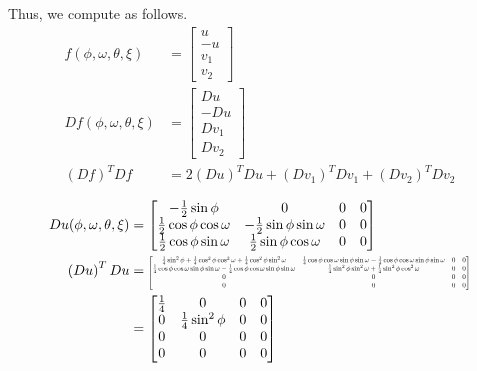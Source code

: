 \documentclass[12pt]{article}
\newcommand*{\Scale}[2][4]{\scalebox{#1}{$#2$}}%
\begin{document}
Thus, we compute as follows. 
\begin{align}
  f(\phi, \omega, \theta, \xi) &= \begin{bmatrix} u \\ -u \\ v_1 \\ v_2 \end{bmatrix} \\
  Df(\phi, \omega, \theta, \xi) &= \begin{bmatrix} Du \\ -Du \\ Dv_1 \\ Dv_2 \end{bmatrix} \\
  \left(Df\right)^TDf &=   2\left(Du\right)^TDu  + \left(Dv_1\right)^TDv_1 + \left(Dv_2\right)^TDv_2 
\end{align}

\begin{align}
  Du(\phi, \omega, \theta, \xi) &= \begin{bmatrix} -\frac{1}{2}\sin\phi & 0 & 0 & 0 \\ \frac{1}{2}\cos\phi\cos\omega & -\frac{1}{2}\sin\phi\sin\omega & 0 & 0\\  \frac{1}{2}\cos\phi\sin\omega & \frac{1}{2}\sin\phi\cos\omega & 0 & 0\end{bmatrix} \\
  \left(Du\right)^TDu &= \Scale[0.50]{\begin{bmatrix} 
\frac{1}{4}\sin^2\phi + \frac{1}{4}\cos^2\phi\cos^2\omega+ \frac{1}{4}\cos^2\phi\sin^2\omega
&  \frac{1}{4}\cos\phi\cos\omega\sin\phi\sin\omega - \frac{1}{4}\cos\phi\cos\omega\sin\phi\sin\omega 
& 0 & 0
\\ \frac{1}{4}\cos\phi\cos\omega\sin\phi\sin\omega - \frac{1}{4}\cos\phi\cos\omega\sin\phi\sin\omega 
& \frac{1}{4}\sin^2\phi\sin^2\omega + \frac{1}{4}\sin^2\phi\cos^2\omega
& 0 & 0
\\ 0
& 0
& 0 & 0\\ 0
& 0
& 0 & 0 \end{bmatrix}} \\
 &= \Scale[1.00]{\begin{bmatrix} 
\frac{1}{4}
& 0
& 0 & 0
\\ 0 
& \frac{1}{4}\sin^2\phi
& 0 & 0
\\ 0
& 0
& 0 & 0\\ 0
& 0
& 0 & 0 \end{bmatrix}}
\end{align} \\
\end{document}
